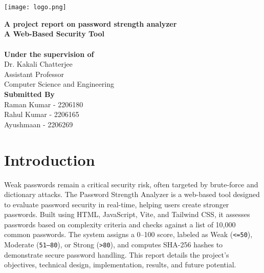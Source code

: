 \documentclass[11pt,a4paper]{report}
\newcommand{\projtitle}{A project report on password strength analyzer}
\newcommand{\projsubtitle}{A Web-Based Security Tool}
\begin{document}
\setcounter{page}{1}

\begin{titlepage}
\center
\vspace*{-12mm}
{\large \textbf{\textsc{\school}}}\\
{\large \textbf{\textsc{\degree}}}\\[10mm]
\begin{center}
    \texttt{[image: logo.png]}
\end{center}

{\huge \textbf{\projtitle}}\\[6mm]
{\Large \textbf{\projsubtitle}}\\

{\Large \textbf{\projcourse}}\\[6mm]
{\Large \textbf{Under the supervision of}}\\[4mm]
{\large Dr. Kakali Chatterjee}\\[2mm]
{\small Assistant Professor}\\[1mm]
{\small Computer Science and Engineering}\\[10mm]
{\Large \textbf{Submitted By}}\\[4mm]

{\large Raman Kumar - 2206180}\\[2mm]
{\large Rahul Kumar - 2206165}\\[2mm]
{\large Ayushmaan - 2206269}\\[40mm]
\end{titlepage}

\tableofcontents
\newpage



\section{Introduction}
Weak passwords remain a critical security risk, often targeted by brute-force and dictionary attacks. The Password Strength Analyzer is a web-based tool designed to evaluate password security in real-time, helping users create stronger passwords. Built using HTML, JavaScript, Vite, and Tailwind CSS, it assesses passwords based on complexity criteria and checks against a list of 10,000 common passwords. The system assigns a 0--100 score, labeled as Weak (\texttt{<=50}), Moderate (\texttt{51--80}), or Strong (\texttt{>80}), and computes SHA-256 hashes to demonstrate secure password handling. This report details the project's objectives, technical design, implementation, results, and future potential.
\end{document}

